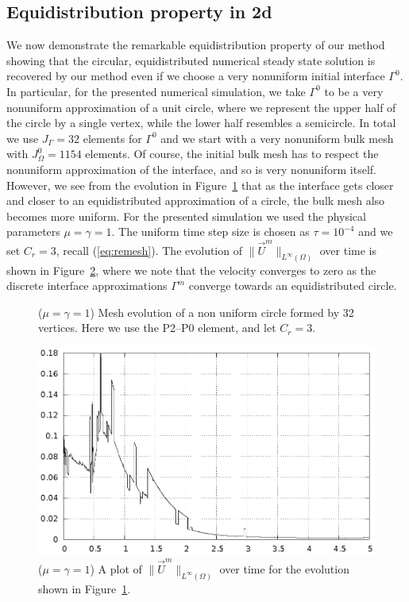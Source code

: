 \documentclass[a4paper,12pt,onecolumn]{article}
\begin{document}
\subsection{Equidistribution property in 2d}
We now demonstrate the remarkable equidistribution property of our method 
showing that the circular, equidistributed numerical steady state solution is 
recovered by our method even if we choose a very nonuniform initial interface 
$\Gamma^0$. In particular, for the presented numerical simulation, we take 
$\Gamma^0$ to be a very nonuniform approximation of a unit circle, where we 
represent the upper half of the circle by a single vertex, while the lower half 
resembles a semicircle. In total we use $J_\Gamma = 32$ elements for $\Gamma^0$ 
and we start with a very nonuniform bulk mesh with $J_\Omega^0 = 1154$ elements.
Of course, the initial bulk mesh has to respect the nonuniform approximation 
of the interface, and so is very nonuniform itself. However, we see from the 
evolution in Figure~\ref{fig:nonuniform_bubble_32_both} that as the interface 
gets closer and closer to an equidistributed approximation of a circle, the 
bulk mesh also becomes more uniform. For the presented simulation we used the 
physical parameters $\mu= \gamma=1$. The uniform time step size is chosen as 
$\tau=10^{-4}$ and we set $C_r=3$, recall (\ref{eq:remesh}). The evolution of 
$\|\vec U^m\|_{L^\infty(\Omega)}$ over time is shown in 
Figure~\ref{fig:nonuniform_bubble_velocity_32_both}, where we note that the
velocity converges to zero as the discrete interface approximations $\Gamma^m$ 
converge towards an equidistributed circle.
\begin{figure}[htbp]
\centering
{}
\caption{($\mu=\gamma=1$) Mesh evolution of a non uniform circle formed by 32 
vertices. Here we use the P2--P0 element, and let $C_r = 3$.}
\label{fig:nonuniform_bubble_32_both}
\end{figure}

\begin{figure}[htbp]
\centering
\includegraphics[width=.45\textwidth]
{figures/nonuniform_bubble_velocity_32_both.ps}
\caption{($\mu=\gamma=1$) A plot of $\|\vec U^m\|_{L^\infty(\Omega)}$ over time
for the evolution shown in Figure~\ref{fig:nonuniform_bubble_32_both}.}
\label{fig:nonuniform_bubble_velocity_32_both}
\end{figure}
\end{document}
